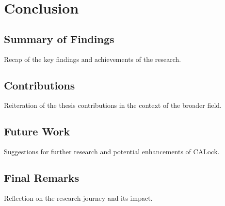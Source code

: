 %

\chapter{Conclusion} \label{chap:conclusion}
\section{Summary of Findings}
Recap of the key findings and achievements of the research.

\section{Contributions}
Reiteration of the thesis contributions in the context of the broader field.

\section{Future Work}
Suggestions for further research and potential enhancements of CALock.

\section{Final Remarks}
Reflection on the research journey and its impact.

